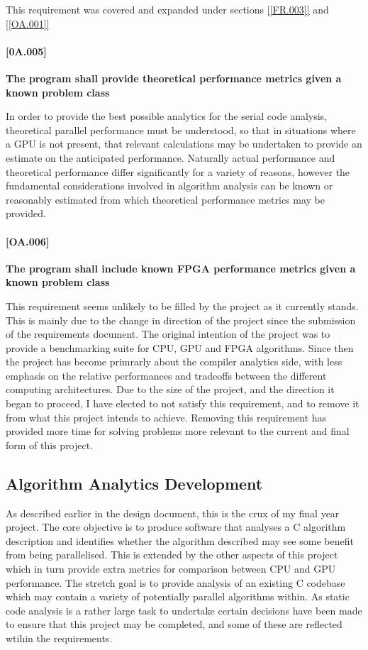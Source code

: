 This requirement was covered and expanded under sections \ref{[FR.003]} and \ref{[OA.001]}

\paragraph{[0A.005]}
\textbf{The program shall provide theoretical performance metrics given a known problem class}

In order to provide the best possible analytics for the serial code analysis, theoretical parallel performance must be understood, so that in situations where a GPU is not present, that relevant calculations may be undertaken to provide an estimate on the anticipated performance. Naturally actual performance and theoretical performance differ significantly for a variety of reasons, however the fundamental considerations involved in algorithm analysis can be known or reasonably estimated from which theoretical performance metrics may be provided.

\paragraph{[OA.006]}
\textbf{The program shall include known FPGA performance metrics given a known problem class}

This requirement seems unlikely to be filled by the project as it currently stands. This is mainly due to the change in direction of the project since the submission of the requirements document. The original intention of the project was to provide a benchmarking suite for CPU, GPU and FPGA algorithms. Since then the project has become primrarly about the compiler analytics side, with less emphasis on the relative performances and tradeoffs between the different computing architectures. Due to the size of the project, and the direction it began to proceed, I have elected to not satisfy this requirement, and to remove it from what this project intends to achieve. Removing this requirement has provided more time for solving problems more relevant to the current and final form of this project.


\subsection{Algorithm Analytics Development}
As described earlier in the design document, this is the crux of my final year project. The core objective is to produce software that analyses a C algorithm description and identifies whether the algorithm described may see some benefit from being parallelised. This is extended by the other aspects of this project which in turn provide extra metrics for comparison between CPU and GPU performance. The stretch goal is to provide analysis of an existing C codebase which may contain a variety of potentially parallel algorithms within. As static code analysis is a rather large task to undertake certain decisions have been made to ensure that this project may be completed, and some of these are reflected wtihin the requirements.

